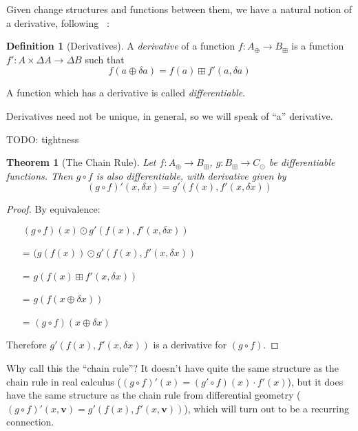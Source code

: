 \documentclass[english]{article}
\theoremstyle{plain}
\newtheorem{thm}{Theorem}
\theoremstyle{definition}
\theoremstyle{remark}
\theoremstyle{remark}
\theoremstyle{remark}
\theoremstyle{definition}
\newtheorem{defn}{Definition}
\newcommand{\cplus}{\oplus}
\newcommand{\cpluss}{\boxplus}
\newcommand{\cplusss}{\odot}
\newcommand{\changes}[1]{\Delta #1}
\newcommand{\change}[1]{\delta #1}
\newcommand{\derive}[1]{#1'}
\begin{document}
Given change structures and functions between them, we have a natural notion of a derivative, following ~\cite{cai2014changes}:

\begin{defn}[Derivatives]
  A \textit{derivative} of a function $f: A_\cplus \rightarrow B_\cpluss$ is a function $\derive{f}: A \times \changes{A} \rightarrow
  \changes{B}$ such that
  $$f(a \cplus \change{a}) = f(a) \cpluss \derive{f}(a, \change{a})$$

  A function which has a derivative is called \textit{differentiable}.
\end{defn}

Derivatives need not be unique, in general, so we will speak of ``a'' derivative.

TODO: tightness

\begin{thm}[The Chain Rule]
  Let $f: A_\cplus \rightarrow B_\cpluss$, $g: B_\cpluss \rightarrow C_\cplusss$ be differentiable functions. Then $g \circ f$ is also
  differentiable, with derivative given by
   $$\derive{(g \circ f)}(x, \change{x}) = \derive{g}\left(f(x), \derive{f}(x, \change{x})\right)$$
\end{thm}
\begin{proof}
  By equivalence:
  \begin{itemize}
    \item[ ]$(g \circ f)(x) \cplusss \derive{g}\left(f(x), \derive{f}(x,\change{x})\right)$
    \item[=]$(g(f(x)) \cplusss \derive{g}\left(f(x), \derive{f}(x,\change{x})\right)$
    \item[=]$g\left(f(x) \cpluss \derive{f}(x, \change{x}) \right)$
    \item[=]$g\left(f(x \cplus \change{x})\right)$
    \item[=]$(g \circ f)(x \cplus \change{x})$
  \end{itemize}
  Therefore $\derive{g}\left(f(x), \derive{f}(x, \change{x})\right)$ is a
  derivative for $(g \circ f)$.
\end{proof}

Why call this the ``chain rule''? It doesn't have quite the same structure as
the chain rule in real calculus ($\derive{(g \circ f)}(x) = (\derive{g} \circ f)
(x) \cdot \derive{f}(x)$), but it does have the same structure as the chain rule
from differential geometry ($\derive{(g \circ f)}(x, \textbf{v}) = \derive{g}
(f(x), \derive{f}(x, \textbf{v}))$), which will turn out to be a recurring connection.
\end{document}
